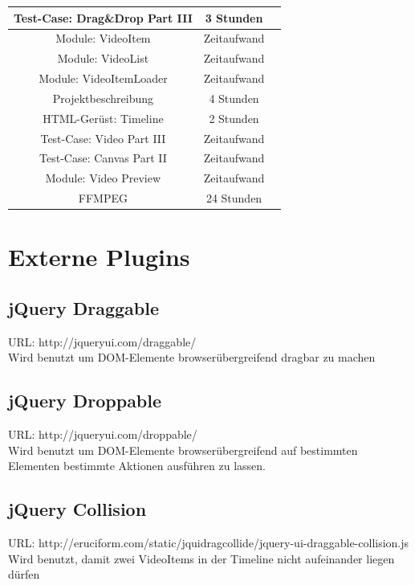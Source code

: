 \documentclass[a4paper,10pt]{scrartcl}
\begin{document}
\begin{tabular}{|c|c|c|}
	Test-Case: Drag\&Drop Part III & 3 Stunden \\ \hline
	
	Module: VideoItem & Zeitaufwand \\ \hline
	
	Module: VideoList & Zeitaufwand \\ \hline
			
	Module: VideoItemLoader & Zeitaufwand \\ \hline
		
	Projektbeschreibung & 4 Stunden \\ \hline
	
	HTML-Gerüst: Timeline & 2 Stunden \\ \hline
	
	Test-Case: Video Part III & Zeitaufwand \\ \hline
	
	Test-Case: Canvas Part II & Zeitaufwand \\ \hline
	
	Module: Video Preview & Zeitaufwand \\ \hline
	
	FFMPEG & 24 Stunden \\ \hline
 \end{tabular}
 \newpage
\section{Externe Plugins}
\subsection{jQuery Draggable}
URL: http://jqueryui.com/draggable/\\
Wird benutzt um DOM-Elemente browserübergreifend dragbar zu machen
\subsection{jQuery Droppable}
URL: http://jqueryui.com/droppable/\\
Wird benutzt um DOM-Elemente browserübergreifend auf bestimmten Elementen bestimmte Aktionen ausführen zu lassen.
\subsection{jQuery Collision}
URL: http://eruciform.com/static/jquidragcollide/jquery-ui-draggable-collision.js\\
Wird benutzt, damit zwei VideoItems in der Timeline nicht aufeinander liegen dürfen
\end{document}
